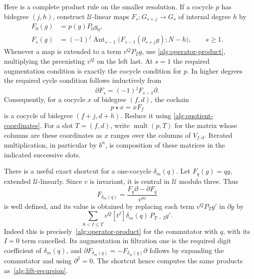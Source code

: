 \documentclass[11pt]{article}
\theoremstyle{definition}
\theoremstyle{remark}
\numberwithin{equation}{section}
\begin{document}
Here is a complete product rule on the smaller resolution.  If a
cocycle $p$ has bidegree $(j,h)$, construct $\mathcal U$-linear maps
$F_s:G_{s+j}\to G_s$ of internal degree $h$ by
\begin{align}
 F_0(g)&=p(g)P_0g_0,\label{alg:lift-base}\\
 F_s(g)&=(-1)^j\operatorname{Ant}_{s-1}
       \bigl(F_{s-1}(\partial_{s+j}g);N-h\bigr),\qquad s\geq1.
       \label{alg:lift-recursion}
\end{align}
Whenever a map is extended to a term $v^QP_Tg$, use
\eqref{alg:operator-product}, multiplying the preexisting $v^Q$ on the
left last.  At $s=1$ the required augmentation condition is exactly the
cocycle condition for $p$.  In higher degrees the required cycle
condition follows inductively from
\begin{equation}\label{alg:signed-lift-identity}
 \partial F_s=(-1)^jF_{s-1}\partial.
\end{equation}
Consequently, for a cocycle $x$ of bidegree $(f,d)$, the cochain
\begin{equation}\label{alg:product}
 p\star x=xF_f
\end{equation}
is a cocycle of bidegree $(f+j,d+h)$.  Reduce it using
\eqref{alg:quotient-coordinates}.  For a slot $T=(f,d)$, write
$\operatorname{mult}(p,T)$ for the matrix whose columns are these
coordinates as $x$ ranges over the columns of $V_{f,d}$.
Iterated multiplication, in particular by $b^n$, is composition of
these matrices in the indicated successive slots.

There is a useful exact shortcut for a one-cocycle $\delta_m(q)$.
Let $F_q(g)=qg$, extended $\mathcal U$-linearly.  Since $v$ is invariant,
it is central in $\mathcal U$ modulo three.  Thus
\begin{equation}\label{alg:delta-lift}
 F_{\delta_m(q)}=\frac{F_q\partial-\partial F_q}{v^m}
\end{equation}
is well defined, and its value is obtained by replacing each term
$v^QP_Tg'$ in $\partial g$ by
\begin{equation}\label{alg:delta-lift-terms}
 \sum_{0<I\leq T}v^Q[t^I]\delta_m(q)\,P_{T-I}g'.
\end{equation}
Indeed this is precisely~\eqref{alg:operator-product} for the
commutator with $q$, with its $I=0$ term cancelled.  Its augmentation
in filtration one is the required digit coefficient of $\delta_m(q)$,
and $\partial F_{\delta_m(q)}=-F_{\delta_m(q)}\partial$ follows by
expanding the commutator and using $\partial^2=0$.  The shortcut hence
computes the same products as~\eqref{alg:lift-recursion}.
\end{document}
